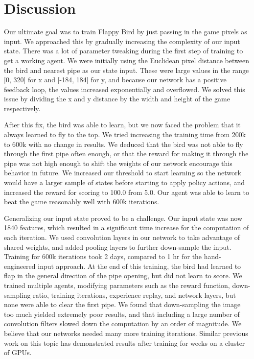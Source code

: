 \documentclass{chi2009}
\begin{document}
\section{Discussion}

Our ultimate goal was to train Flappy Bird by just passing in the game pixels as input. We approached this by gradually increasing the complexity of our input state. There was a lot of parameter tweaking during the first step of training to get a working agent. We were initially using the Euclidean pixel distance between the bird and nearest pipe as our state input. These were large values in the range [0, 320] for x and [-184, 184] for y, and because our network has a positive feedback loop, the values increased exponentially and overflowed. We solved this issue by dividing the x and y distance by the width and height of the game respectively.

After this fix, the bird was able to learn, but we now faced the problem that it always learned to fly to the top. We tried increasing the training time from 200k to 600k with no change in results. We deduced that the bird was not able to fly through the first pipe often enough, or that the reward for making it through the pipe was not high enough to shift the weights of our network encourage this behavior in future. We increased our threshold to start learning so the network would have a larger sample of states before starting to apply policy actions, and increased the reward for scoring to 100.0 from 5.0. Our agent was able to learn to beat the game reasonably well with 600k iterations.

Generalizing our input state proved to be a challenge. Our input state was now 1840 features, which resulted in a significant time increase for the computation of each iteration. We used convolution layers in our network to take advantage of shared weights, and added pooling layers to further down-sample the input. Training for 600k iterations took 2 days, compared to 1 hr for the hand-engineered input approach. At the end of this training, the bird had learned to flap in the general direction of the pipe opening, but did not learn to score. We trained multiple agents, modifying parameters such as the reward function, down-sampling ratio, training iterations, experience replay, and network layers, but none were able to clear the first pipe. We found that down-sampling the image too much yielded extremely poor results, and that including a large number of convolution filters slowed down the computation by an order of magnitude. We believe that our networks needed many more training iterations. Similar previous work on this topic has demonstrated results after training for weeks on a cluster of GPUs.
\end{document}
